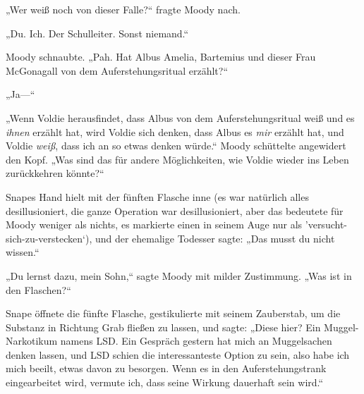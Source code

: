 „Wer weiß noch von dieser Falle?“ fragte Moody nach.

„Du. Ich. Der Schulleiter. Sonst niemand.“

Moody schnaubte. „Pah. Hat Albus Amelia, Bartemius und dieser Frau McGonagall von dem Auferstehungsritual erzählt?“

„Ja—“

„Wenn Voldie herausfindet, dass Albus von dem Auferstehungsritual weiß und es \emph{ihnen} erzählt hat, wird Voldie sich denken, dass Albus es \emph{mir} erzählt hat, und Voldie \emph{weiß}, dass ich an so etwas denken würde.“ Moody schüttelte angewidert den Kopf. „Was sind das für andere Möglichkeiten, wie Voldie wieder ins Leben zurückkehren könnte?“

Snapes Hand hielt mit der fünften Flasche inne (es war natürlich alles desillusioniert, die ganze Operation war desillusioniert, aber das bedeutete für Moody weniger als nichts, es markierte einen in seinem Auge nur als 'versucht-sich-zu-verstecken`), und der ehemalige Todesser sagte: „Das musst du nicht wissen.“

„Du lernst dazu, mein Sohn,“ sagte Moody mit milder Zustimmung. „Was ist in den Flaschen?“

Snape öffnete die fünfte Flasche, gestikulierte mit seinem Zauberstab, um die Substanz in Richtung Grab fließen zu lassen, und sagte: „Diese hier? Ein Muggel-Narkotikum namens LSD. Ein Gespräch gestern hat mich an Muggelsachen denken lassen, und LSD schien die interessanteste Option zu sein, also habe ich mich beeilt, etwas davon zu besorgen. Wenn es in den Auferstehungstrank eingearbeitet wird, vermute ich, dass seine Wirkung dauerhaft sein wird.“

